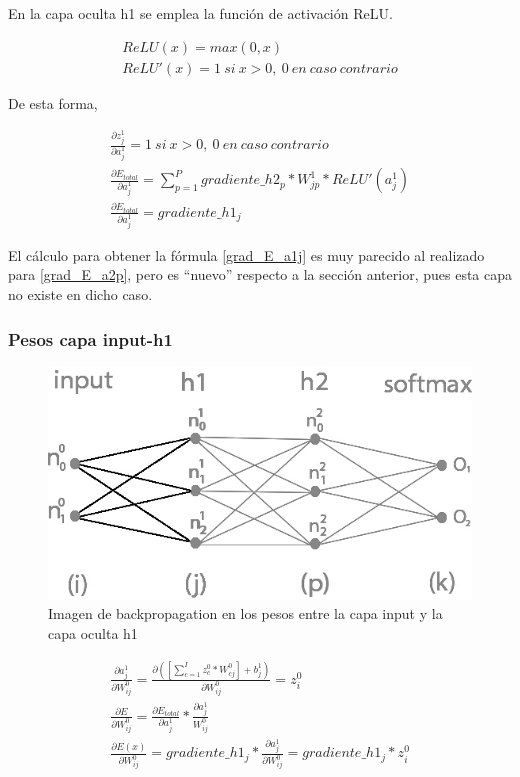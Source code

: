 En la capa oculta h1 se emplea la función de activación ReLU. 

\begin{gather}
	ReLU(x) = max(0, x) \\
	ReLU'(x) = 1\ si\ x>0,\ 0\ en\ caso\ contrario
	\label{deriv_relu}
\end{gather}

De esta forma,


\begin{gather}
	\frac{\partial z^1_ j}{\partial a^1_j} = 1\ si\ x>0,\ 0\ en\ caso\ contrario \\
	\frac{\partial E_{total}}{\partial a^1_j} = \sum_{p=1}^P  gradiente\_h2_p * W^1_{jp} * ReLU'(a^1_j) \\
	\frac{\partial E_{total}}{\partial a^1_j} = gradiente\_h1_j
	\label{grad_E_a1j}
\end{gather}

El cálculo para obtener la fórmula \ref{grad_E_a1j} es muy parecido al realizado para \ref{grad_E_a2p}, pero es ``nuevo'' respecto a la sección anterior, pues esta capa no existe en dicho caso. \\


\subsubsection{Pesos capa input-h1}

\begin{figure}[H]
	\centering
	\includegraphics[scale=0.35]{imagenes/nn_2_capa_pesos_input_h1.jpg}  
	\caption{Imagen de backpropagation en los pesos entre la capa input y la capa oculta h1}
	\label{fig:nn_2_pesos_input_h1}
\end{figure}


\begin{gather}
	\frac{\partial a^1_j }{\partial W^0_{ij} } = \frac{\partial ([\sum_{c=1}^{I} z^0_c * W^0_{cj}] + b^1_j)}{\partial W^0_{ij} } = z^0_i \\
	\frac{\partial E}{\partial W^0_{ij}} = \frac{\partial E_{total} }{\partial a^1_j } * \frac{\partial a^1_j}{W^0_{ij}} \\
	\frac{\partial E(x) }{\partial W^0_{ij} } = gradiente\_h1_j * \frac{\partial a^1_j }{\partial W^0_{ij} } = gradiente\_h1_j * z^0_i 
\end{gather}

